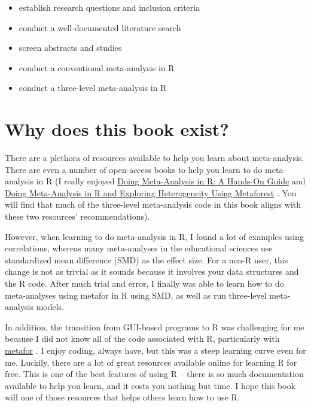 \documentclass[
]{book}
\begin{document}
\begin{itemize}
\item
  establish research questions and inclusion criteria
\item
  conduct a well-documented literature search
\item
  screen abstracts and studies
\item
  conduct a conventional meta-analysis in R
\item
  conduct a three-level meta-analysis in R
\end{itemize}

\hypertarget{why-does-this-book-exist}{%
\section*{Why does this book exist?}\label{why-does-this-book-exist}}

There are a plethora of resources available to help you learn about meta-analysis. There are even a number of open-access books to help you learn to do meta-analysis in R (I really enjoyed \protect\hyperlink{0}{Doing Meta-Analysis in R: A Hands-On Guide} \citep{harrer2021} and \protect\hyperlink{0}{Doing Meta-Analysis in R and Exploring Heterogeneity Using Metaforest} \citep{vanlissa}. You will find that much of the three-level meta-analysis code in this book aligns with these two resources' recommendations).

However, when learning to do meta-analysis in R, I found a lot of examples using correlations, whereas many meta-analyses in the educational sciences use standardized mean difference (SMD) as the effect size. For a non-R user, this change is not as trivial as it sounds because it involves your data structures and the R code. After much trial and error, I finally was able to learn how to do meta-analyses using metafor in R using SMD, as well as run three-level meta-analysis models.

In addition, the transition from GUI-based programs to R was challenging for me because I did not know all of the code associated with R, particularly with \href{http://www.metafor-project.org/doku.php/metafor}{metafor} \citep{viechtbauer2010}. I enjoy coding, always have, but this was a steep learning curve even for me. Luckily, there are a lot of great resources available online for learning R for free. This is one of the best features of using R -- there is so much documentation available to help you learn, and it costs you nothing but time. I hope this book will one of those resources that helps others learn how to use R.
\end{document}
